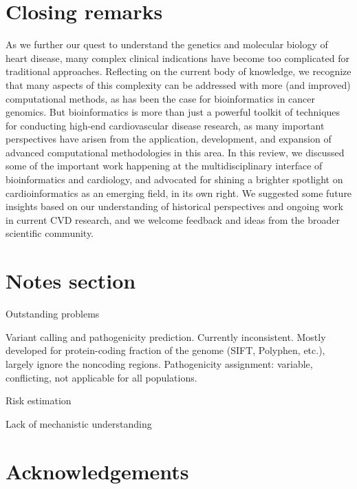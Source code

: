 \documentclass[letter]{bioinfo}
\begin{document}
	\section*{Closing remarks}
	As we further our quest to understand the genetics and molecular biology of heart disease, many complex clinical indications have become too complicated for traditional approaches. Reflecting on the current body of knowledge, we recognize that many aspects of this complexity can be addressed with more (and improved) computational methods, as has been the case for bioinformatics in cancer genomics.  But bioinformatics is more than just a powerful toolkit of techniques for conducting high-end cardiovascular disease research, as many important perspectives have arisen from the application, development, and expansion of advanced computational methodologies in this area.  In this review, we discussed some of the important work happening at the multidisciplinary interface of bioinformatics and cardiology, and advocated for shining a brighter spotlight on cardioinformatics as an emerging field, in its own right.  We suggested some future insights based on our understanding of historical perspectives and ongoing work in current CVD research, and we welcome feedback and ideas from the broader scientific community.

	
	\section*{Notes section}
	
	
	Outstanding problems
	
	Variant calling and pathogenicity prediction. Currently inconsistent. Mostly developed for protein-coding fraction of the genome (SIFT, Polyphen, etc.), largely ignore the noncoding regions.
	Pathogenicity assignment: variable, conflicting, not applicable for all populations.
	
	Risk estimation
	
	Lack of mechanistic understanding
	
	


	
	

	\enlargethispage{12pt}
	
	
	
	
	\section*{Acknowledgements}
	
\end{document}
